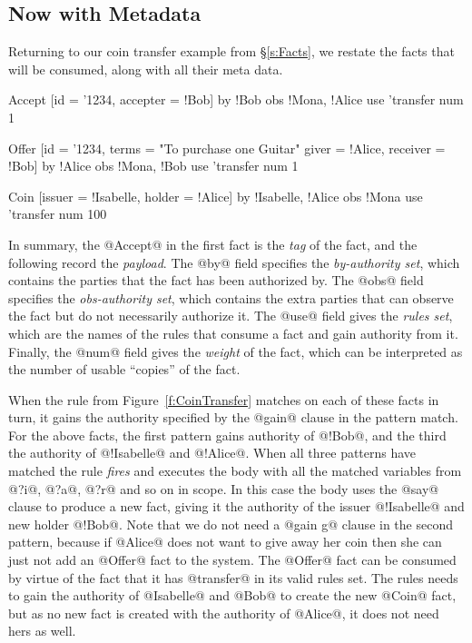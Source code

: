 \subsection{Now with Metadata}
\label{s:NowWithMetadata}

Returning to our coin transfer example from \S\ref{s:Facts}, we restate the facts that will be consumed, along with all their meta data.

\begin{small}
\begin{code}
 Accept [id = '1234, accepter = !Bob]
    by  {!Bob}                obs {!Mona, !Alice}
    use {'transfer}           num 1

 Offer  [id = '1234, terms = "To purchase one Guitar"
         giver = !Alice, receiver = !Bob]
    by  {!Alice}              obs {!Mona, !Bob}
    use {'transfer}           num 1

 Coin   [issuer = !Isabelle, holder  = !Alice]
    by  {!Isabelle, !Alice}   obs {!Mona}
    use {'transfer}           num 100
\end{code}
\end{small}

In summary, the @Accept@ in the first fact is the \emph{tag} of the fact, and the following record the \emph{payload}. The @by@ field specifies the \emph{by-authority set}, which contains the parties that the fact has been authorized by. The @obs@ field specifies the \emph{obs-authority set}, which contains the extra parties that can observe the fact but do not necessarily authorize it. The @use@ field gives the \emph{rules set}, which are the names of the rules that consume a fact and gain authority from it. Finally, the @num@ field gives the \emph{weight} of the fact, which can be interpreted as the number of usable ``copies'' of the fact.

When the rule from Figure~\ref{f:CoinTransfer} matches on each of these facts in turn, it gains the authority specified by the @gain@ clause in the pattern match. For the above facts, the first pattern gains authority of @!Bob@, and the third the authority of @!Isabelle@ and @!Alice@. When all three patterns have matched the rule \emph{fires} and executes the body with all the matched variables from @?i@, @?a@, @?r@ and so on in scope. In this case the body uses the @say@ clause to produce a new fact, giving it the authority of the issuer @!Isabelle@ and new holder @!Bob@. Note that we do not need a @gain g@ clause in the second pattern, because if @Alice@ does not want to give away her coin then she can just not add an @Offer@ fact to the system. The @Offer@ fact can be consumed by virtue of the fact that it has @transfer@ in its valid rules set. The rules needs to gain the authority of @Isabelle@ and @Bob@ to create the new @Coin@ fact, but as no new fact is created with the authority of @Alice@, it does not need hers as well.

